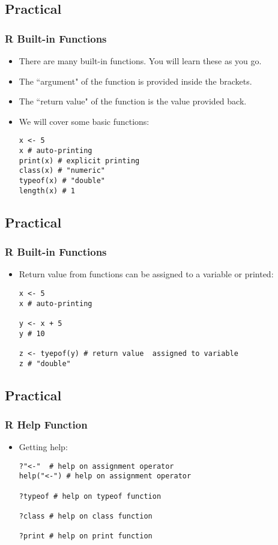 \documentclass[11pt]{beamer}
\begin{document}
\subsection{Practical}
\begin{frame}[fragile]
\frametitle{{\sf R} Built-in Functions}
\begin{itemize}
\item There are many built-in functions. You will learn these as you go. 
\vspace{0.1in}
\item The ``argument" of the function is provided inside the brackets.
\vspace{0.1in}
\item The ``return value" of the function is the value provided back.
\vspace{0.1in}
\item We will cover some basic functions: 
\begin{verbatim}
x <- 5
x # auto-printing
print(x) # explicit printing
class(x) # "numeric"
typeof(x) # "double"
length(x) # 1
\end{verbatim}
\vspace{0.1in}
\end{itemize}
\end{frame}


\subsection{Practical}
\begin{frame}[fragile]
\frametitle{{\sf R} Built-in Functions}
\begin{itemize}
\item Return value from functions can be assigned to a variable or printed:
\begin{verbatim}
x <- 5
x # auto-printing

y <- x + 5 
y # 10

z <- tyepof(y) # return value  assigned to variable
z # "double"
\end{verbatim}
\vspace{0.1in}
\end{itemize}
\end{frame}


\subsection{Practical}
\begin{frame}[fragile]
\frametitle{{\sf R} Help Function}
\begin{itemize}
\item Getting help:
\vspace{0.1in}
\begin{verbatim}
?"<-"  # help on assignment operator
help("<-") # help on assignment operator

?typeof # help on typeof function

?class # help on class function

?print # help on print function
\end{verbatim}
\end{itemize}
\end{frame}
\end{document}
